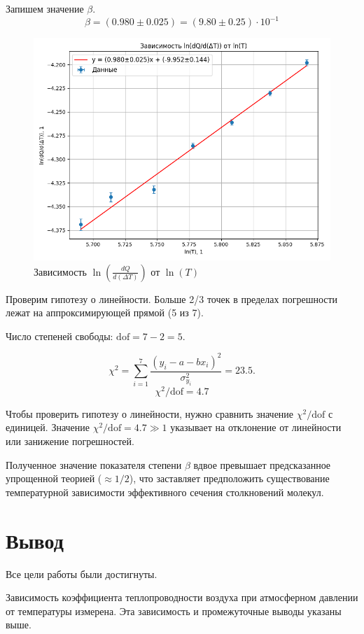\documentclass[a4paper,12pt]{article} %
\begin{document}
\begin{enumerate}
    Запишем значение $\beta$.
    \[
      \beta = (0.980 \pm 0.025) = (9.80 \pm 0.25) \cdot 10^{-1} 
    \]

    \begin{figure}[h!]
      \centering
      \includegraphics[scale=0.75]{graph_ln.png}
      \caption{Зависимость $\ln(\frac{dQ}{d(\Delta T)})$ от $\ln(T)$}
      \label{fig:ln}
    \end{figure}

    Проверим гипотезу о линейности. Больше 2/3 точек в пределах погрешности лежат на аппроксимирующей прямой (5 из 7).

    Число степеней свободы: \( \text{dof} = 7 - 2 = 5 \).

    \[
      \chi^2 = \sum_{i=1}^7 \frac{(y_i - a - b x_i)^2}{\sigma_{y_i}^2} = 23.5.
    \]  
    \[
      \chi^2/\text{dof} = 4.7
    \]

    Чтобы проверить гипотезу о линейности, нужно сравнить значение $\chi^2/\text{dof}$ с единицей. Значение \( \chi^2/\text{dof} = 4.7 \gg 1 \) указывает на отклонение от линейности или занижение погрешностей.  

    Полученное значение показателя степени $\beta$ вдвое превышает предсказанное упрощенной теорией ($\approx 1/2$), что заставляет предположить существование температурной зависимости эффективного сечения столкновений молекул.
\end{enumerate}

\section*{Вывод}

Все цели работы были достигнуты.

Зависимость коэффициента теплопроводности воздуха при атмосферном давлении от температуры измерена. Эта зависимость и промежуточные выводы указаны выше.
\end{document}
